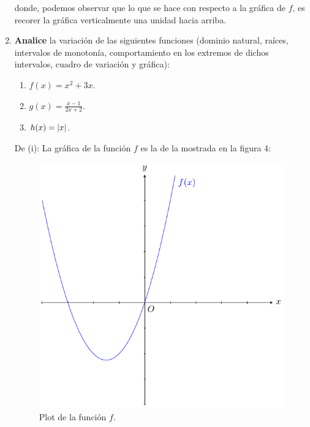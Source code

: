 \documentclass[12pt]{article}
\begin{document}
\begin{enumerate}
\begin{sol}
        donde, podemos observar que lo que se hace con respecto a la gráfica de $f$, es recorer la gráfica verticalmente una unidad hacia arriba.
    \end{sol}

    \item \textbf{Analice} la variación de las siguientes funciones (dominio natural, raíces, intervalos de monotonía, comportamiento en los extremos de dichos intervalos, cuadro de variación y gráfica):
    \begin{enumerate}
        \item $f(x)=x^2+3x$.
        \item $g(x)=\frac{x-1}{2x+2}$.
        \item $h(x)=\left| x \right|$.
    \end{enumerate}

    \begin{sol}
        De (i): La gráfica de la función $f$ es la de la mostrada en la figura 4:
        \begin{figure}
            \begin{center}
                \includegraphics[scale=1]{images/3_2_1.pdf}
            \end{center}
            \caption{Plot de la función $f$.}
        \end{figure}


\end{sol}
\end{enumerate}
\end{document}
